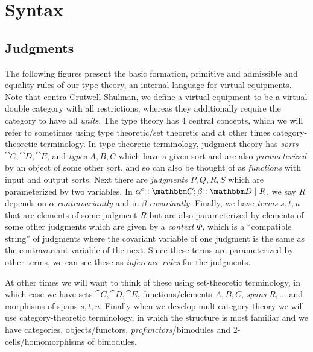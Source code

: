 \documentclass{article}
\begin{document}
\section{Syntax}

\subsection{Judgments}
The following figures present the basic formation, primitive and
admissible and equality rules of our type theory, an internal language
for virtual equipments.
%
Note that contra Crutwell-Shulman, we define a virtual equipment to be
a virtual double category with all restrictions, whereas they
additionally require the category to have all \emph{units}.
%
The type theory has 4 central concepts, which we will refer to
sometimes using type theoretic/set theoretic and at other times
category-theoretic terminology.
%
In type theoretic terminology, judgment theory has \emph{sorts} $\cat
C, \cat D, \cat E$, and \emph{types} $A,B,C$ which have a given sort
and are also \emph{parameterized} by an object of some other sort, and
so can also be thought of as \emph{functions} with input and output
sorts.
%
Next there are \emph{judgments} $P,Q,R,S$ which are parameterized by
two variables.
%
In $\alpha^o:\cat C;\beta : \cat D \pipe R$, we say $R$ depends on
$\alpha$ \emph{contravariantly} and in $\beta$ \emph{covariantly}.
%
Finally, we have \emph{terms} $s,t,u$ that are elements of some
judgment $R$ but are also parameterized by elements of some other
judgments which are given by a \emph{context} $\Phi$, which is a
``compatible string'' of judgments where the covariant variable of one
judgment is the same as the contravariant variable of the next.
%
Since these terms are parameterized by other terms, we can see these
as \emph{inference rules} for the judgments.

At other times we will want to think of these using set-theoretic
terminology, in which case we have sets $\cat C,\cat D, \cat E$,
functions/elements $A,B,C$, \emph{spans} $R,\ldots$ and morphisms of
spans $s,t,u$.
%
Finally when we develop multicategory theory we will use
category-theoretic terminology, in which the structure is most
familiar and we have categories, objects/functors,
\emph{profunctors}/bimodules and 2-cells/homomorphisms of bimodules.
\end{document}
